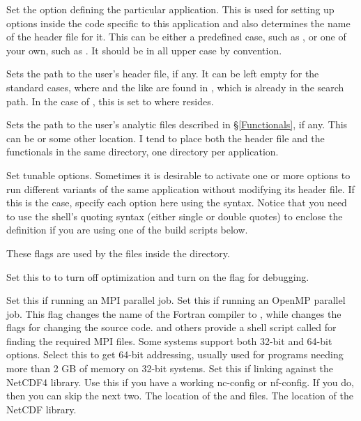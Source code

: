 \begin{klist}

 Set the  option defining the particular
application. This is used for setting up options inside the code
specific to this application and also determines the name of the
 header file for it. This can be either a predefined
case, such as , or one of your own, such as .
It should be in all upper case by convention.

 Sets the path to the user's header file, if
any. It can be left empty for the standard cases, where 
and the like are found in , which is already in
the search path. In the case of , this is set to
 where  resides.

 Sets the path to the user's analytic files
described in \S\ref{Functionals}, if any. This can be 
or some other location. I tend to place both the header file and the
functionals in the same directory, one directory per application.

 Set tunable  options. Sometimes it is desirable
to activate one or more  options to run different variants of the
same application without modifying its header file. If this is the
case, specify each option here using the  syntax. Notice that
you need to use the shell's quoting syntax (either single or double
quotes) to enclose the definition if you are using one of the build
scripts below.


 These flags are used by the files
inside the  directory.
\begin{klist}
   Set this to  to turn off optimization
and turn on the  flag for debugging.

   Set this if running an MPI parallel job.
   Set this if running an OpenMP parallel job.
   This flag changes the name of the
  Fortran compiler to , while
   changes the  flags
  for changing the source code.  and others
  provide a shell script called  for finding the required MPI
  files.
    Some systems support both 32-bit and 64-bit
  options. Select this to get 64-bit addressing, usually used for
  programs needing more than 2 GB of memory on 32-bit systems.
   Set this if linking against the NetCDF4
  library. Use this if you have a working nc-config or nf-config.
  If you do, then you can skip the next two.
   The location of the  and
   files.
   The location of the NetCDF library.
\end{klist}


\end{klist}
